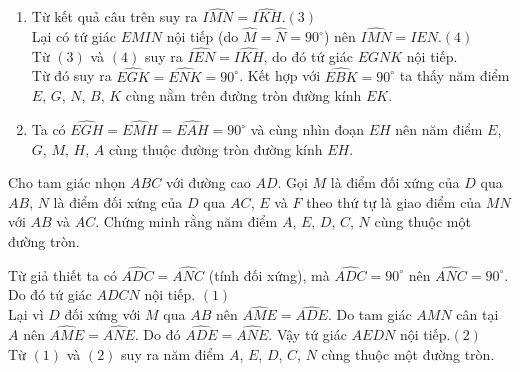 \begin{bt}
{\begin{enumerate}
   Mà $IC=ID$ nên từ $(1)$ và $(2)$ suy ra $IM \cdot IH = IN \cdot IK$.\\
   Suy ra bốn điểm $H$, $M$, $N$, $K$ cùng nằm trên đường tròn.
   \item Từ kết quả câu trên suy ra $\widehat{IMN}=\widehat{IKH}$.\hfill$(3)$\\
   Lại có tứ giác $EMIN$ nội tiếp (do $\widehat{M}=\widehat{N}=90^\circ$) nên $\widehat{IMN}=\widehat{IEN}$.\hfill$(4)$\\
   Từ $(3)$ và $(4)$ suy ra $\widehat{IEN}=\widehat{IKH}$, do đó tứ giác $EGNK$ nội tiếp.\\
   Từ đó suy ra $\widehat{EGK}=\widehat{ENK}=90^\circ$. Kết hợp với $\widehat{EBK}=90^\circ$ ta thấy năm điểm $E$, $G$, $N$, $B$, $K$ cùng nằm trên đường tròn đường kính $EK$.
   \item Ta có $\widehat{EGH}=\widehat{EMH}=\widehat{EAH}=90^\circ$ và cùng nhìn đoạn $EH$ nên năm điểm $E$, $G$, $M$, $H$, $A$ cùng thuộc đường tròn đường kính $EH$.
  \end{enumerate}
  }
\end{bt}

\begin{bt}%
 Cho tam giác nhọn $ABC$ với đường cao $AD$. Gọi $M$ là điểm đối xứng của $D$ qua $AB$, $N$ là điểm đối xứng của $D$ qua $AC$, $E$ và $F$ theo thứ tự là giao điểm của $MN$ với $AB$ và $AC$. Chứng minh rằng năm điểm $A$, $E$, $D$, $C$, $N$ cùng thuộc một đường tròn.
 \loigiai
  {
  \immini
  {
  Từ giả thiết ta có $\widehat{ADC}=\widehat{ANC}$ (tính đối xứng), mà $\widehat{ADC}=90^\circ$ nên $\widehat{ANC}=90^\circ$. Do đó tứ giác $ADCN$ nội tiếp. \hfill $(1)$\\
  Lại vì $D$ đối xứng với $M$ qua $AB$ nên $\widehat{AME}=\widehat{ADE}$. Do tam giác $AMN$ cân tại $A$ nên $\widehat{AME}=\widehat{ANE}$. Do đó $\widehat{ADE}=\widehat{ANE}$. Vậy tứ giác $AEDN$ nội tiếp.\hfill $(2)$\\
  Từ $(1)$ và $(2)$ suy ra năm điểm $A$, $E$, $D$, $C$, $N$ cùng thuộc một đường tròn.
  }
  {
  }
  }
\end{bt}


